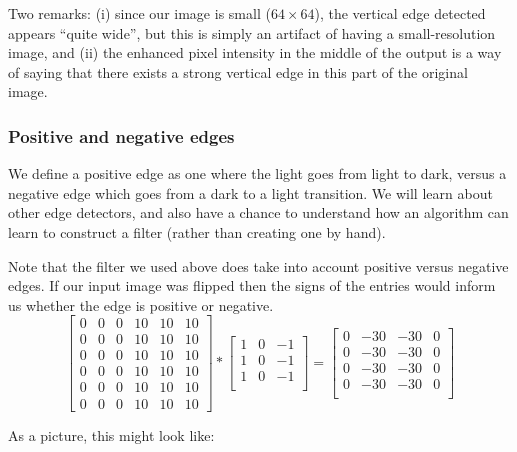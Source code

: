 \documentclass[12pt]{article}
\begin{document}
Two remarks: (i) since our image is small ($64 \times 64$), the vertical edge detected appears ``quite wide'', but this is simply
an artifact of having a small-resolution image, and (ii) the enhanced pixel intensity in the middle of the output is a way of
saying that there exists a strong vertical edge in this part of the original image.

\subsubsection{Positive and negative edges} 
We define a positive edge as one where the light goes from light to dark, versus a negative edge
which goes from a dark to a light transition. We will learn about other edge detectors, and also have a chance to understand
how an algorithm can learn to construct a filter (rather than creating one by hand).

Note that the filter we used above does take into account positive versus negative edges. If our input image was flipped
then the signs of the entries would inform us whether the edge is positive or negative.
\begin{equation*}   \begin{bmatrix}
 0 & 0 & 0 & 10 & 10 & 10 \\
 0 & 0 & 0 & 10 & 10 & 10 \\
 0 & 0 & 0 & 10 & 10 & 10 \\
 0 & 0 & 0 & 10 & 10 & 10 \\
 0 & 0 & 0 & 10 & 10 & 10 \\
 0 & 0 & 0 & 10 & 10 & 10
  \end{bmatrix} 
  * 
  \begin{bmatrix}     
    1 & 0 & -1 \\     
    1 & 0 & -1 \\
    1 & 0 & -1 \\
  \end{bmatrix}
  =
  \begin{bmatrix}     0 & -30 & -30 & 0 \\
    0 & -30 & -30 & 0 \\
    0 & -30 & -30 & 0 \\
    0 & -30 & -30 & 0 \\
  \end{bmatrix} 
\end{equation*}

As a picture, this might look like:
\begin{figure}[h]
  \centering
\end{figure}
\end{document}
